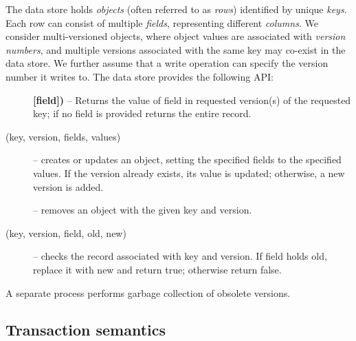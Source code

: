 The  data store holds  \emph{objects} (often referred to as \emph{rows}) identified by unique \emph{keys}.
Each row can consist of multiple \emph{fields}, representing different \emph{columns}. 
We consider multi-versioned objects, where object values are associated with \emph{version numbers}, and
multiple versions associated with the same key may co-exist in the data store.
We further assume that a write operation can specify the version number it writes to.
The  data store provides the following API:
\begin{description}
\item []{\bf[field])} --  Returns the value of field in requested version(s) of the requested key; 
if no field is provided returns the entire record. 
\item [(key, version, fields, values)] -- 
creates or updates an object, setting the specified fields to the specified values. 
If the version already exists, its value is updated; otherwise, a new version is added. 
\item [] -- removes an object with the given key and version.
\item [(key, version, field, old, new)] -- checks the record associated with key and version. 
If field holds old, replace it with new   and return true; otherwise return false.
\end{description}

A separate process performs garbage collection of obsolete versions.

\subsection{Transaction semantics} \label{ssec:transactions}

